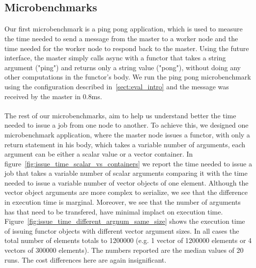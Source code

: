 \subsection{Microbenchmarks}
\label{sect:microbenchmark}
\paragraph{}
	Our first microbenchmark is a ping pong application, which is used to measure the time needed to send a 
message from the master to a worker node and the time needed for the worker node to respond back to the master.
Using the future interface, the master simply calls async with a functor that takes a string argument ("ping") 
and returns only a string value ("pong"), without doing any other computations in the functor's body.  We run
the ping pong microbenchmark using the configuration described in~\ref{sect:eval_intro} and the message was 
received by the master in 0.8ms.

\paragraph{}
	The rest of our microbenchmarks, aim to help us understand better the time needed to issue a job from one
node to another.  To achieve this, we designed one microbenchmark application, where the master node issues
a functor, with only a return statement in his body, which takes a variable number of arguments, each argument
can be either a scalar value or a vector container.  In figure~\ref{fig:issue_time_scalar_vs_containers} we report
the time needed to issue a job that takes a variable number of scalar arguments comparing it with the time needed
to issue a variable number of vector objects of one element.  Although the vector object arguments are more complex
to serialize, we see that the difference in execution time is marginal.  Moreover, we see that the number of arguments
has that need to be transfered, have minimal implact on execution time.  
Figure~\ref{fig:issue_time_different_argnum_same_size} shows the execution time of issuing functor objects with different
vector argument sizes.  In all cases the total number of elements totals to 1200000 (e.g. 1 vector of 1200000 elements or
4 vectors of 300000 elements).   The numbers reported are the median values of 20 runs.  The cost differences here are 
again insignificant. 

